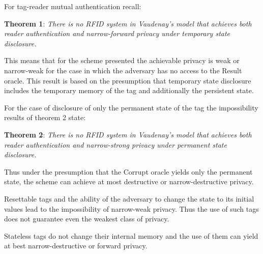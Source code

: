     For tag-reader mutual authentication recall:

    \textbf{Theorem 1}: \textit{There is no RFID system in Vaudenay's model that achieves both reader authentication and narrow-forward privacy 
    under temporary state disclosure.}

    This means that for the scheme presented the achievable privacy is weak or narrow-weak for the case in which the adversary has no
    access to the Result oracle. This result is based on the presumption that temporary state disclosure includes the temporary
    memory of the tag and additionally the persistent state.

    For the case of disclosure of only the permanent state of the tag the impossibility results of theorem 2 state:

    \textbf{Theorem 2}: \textit{There is no RFID system in Vaudenay's model that achieves both reader authentication and narrow-strong privacy 
    under permanent state disclosure.}

    Thus under the presumption that the Corrupt oracle yields only the permanent state, the scheme can achieve at most destructive or
    narrow-destructive privacy.

    Resettable tags and the ability of the adversary to change the state to its initial values lead to the impossibility of narrow-weak
    privacy. Thus the use of such tags does not guarantee even the weakest class of privacy.

    Stateless tags do not change their internal memory and the use of them can yield at best narrow-destructive or forward privacy.
